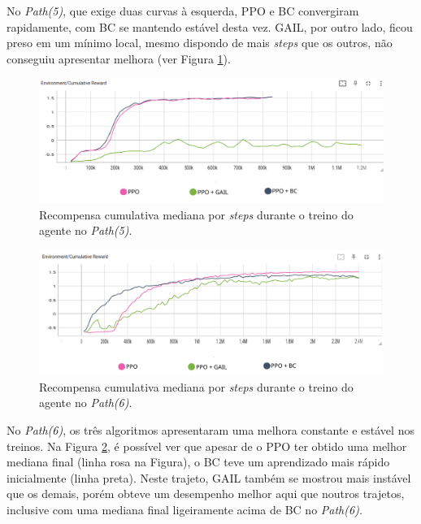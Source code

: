 No \textit{Path(5)}, que exige duas curvas à esquerda, PPO e BC convergiram rapidamente, com BC se mantendo estável desta vez. GAIL, por outro lado, ficou preso em um mínimo local, mesmo dispondo de mais \textit{steps} que os outros, não conseguiu apresentar melhora (ver Figura \ref{fig:result-desafio-2-path-5}).

\begin{figure}[h]
    \centering
    \includegraphics[scale=0.35]{figs/treinos/desafio-dificil/path-5_recompensas-algos.png}
    \caption{Recompensa cumulativa mediana por \textit{steps} durante o treino do agente no \textit{Path(5)}.}
    \label{fig:result-desafio-2-path-5}
\end{figure}

\begin{figure}[h]
    \centering
    \includegraphics[scale=0.35]{figs/treinos/desafio-dificil/path-6_recompensas-algos.png}
    \caption{Recompensa cumulativa mediana por \textit{steps} durante o treino do agente no \textit{Path(6)}.}
    \label{fig:result-desafio-2-path-6}
\end{figure}

No \textit{Path(6)}, os três algoritmos apresentaram uma melhora constante e estável nos treinos. Na Figura \ref{fig:result-desafio-2-path-6}, é possível ver que apesar de o PPO ter obtido uma melhor mediana final (linha rosa na Figura), o BC teve um aprendizado mais rápido inicialmente (linha preta). Neste trajeto, GAIL também se mostrou mais instável que os demais, porém obteve um desempenho melhor aqui que noutros trajetos, inclusive com uma mediana final ligeiramente acima de BC no \textit{Path(6)}.

